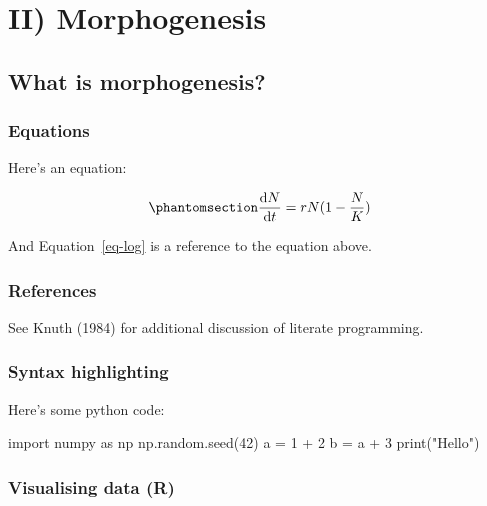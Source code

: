 \documentclass[
  letterpaper,
  DIV=11,
  numbers=noendperiod]{scrreprt}
\newenvironment{Shaded}{\begin{snugshade}}{\end{snugshade}}
\newcommand{\BuiltInTok}[1]{\textcolor[rgb]{0.00,0.23,0.31}{#1}}
\newcommand{\DecValTok}[1]{\textcolor[rgb]{0.68,0.00,0.00}{#1}}
\newcommand{\ImportTok}[1]{\textcolor[rgb]{0.00,0.46,0.62}{#1}}
\newcommand{\NormalTok}[1]{\textcolor[rgb]{0.00,0.23,0.31}{#1}}
\newcommand{\OperatorTok}[1]{\textcolor[rgb]{0.37,0.37,0.37}{#1}}
\newcommand{\StringTok}[1]{\textcolor[rgb]{0.13,0.47,0.30}{#1}}
\theoremstyle{definition}
\theoremstyle{remark}
\begin{document}
\part{II) Morphogenesis}

\chapter{What is morphogenesis?}\label{what-is-morphogenesis}

\section{Equations}\label{equations-5}

Here's an equation:

\begin{equation}\phantomsection\label{eq-log}{ 
\frac{\mathrm{d}N}{\mathrm{d}t} = rN(1 - \frac{N}{K}) 
}\end{equation}

And Equation~\ref{eq-log} is a reference to the equation above.

\section{References}\label{references-5}

See Knuth (1984) for additional discussion of literate programming.

\section{Syntax highlighting}\label{syntax-highlighting-5}

Here's some python code:

\begin{Shaded}
\begin{Highlighting}[]
\ImportTok{import}\NormalTok{ numpy }\ImportTok{as}\NormalTok{ np}
\NormalTok{np.random.seed(}\DecValTok{42}\NormalTok{)}
\NormalTok{a }\OperatorTok{=} \DecValTok{1} \OperatorTok{+} \DecValTok{2}
\NormalTok{b }\OperatorTok{=}\NormalTok{ a }\OperatorTok{+} \DecValTok{3}
\BuiltInTok{print}\NormalTok{(}\StringTok{"Hello"}\NormalTok{)}
\end{Highlighting}
\end{Shaded}

\section{Visualising data (R)}\label{visualising-data-r-5}
\end{document}
